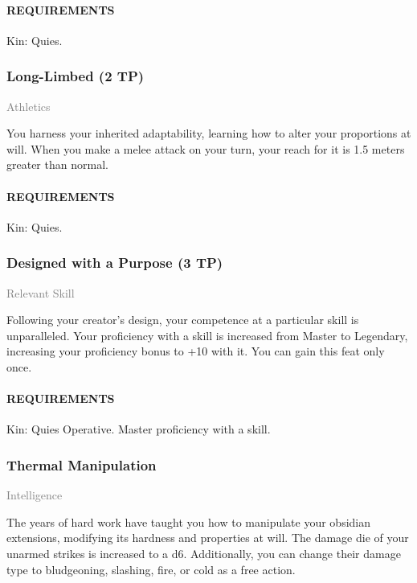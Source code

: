     \paragraph{REQUIREMENTS} Kin: Quies.

    \subsubsection{Long-Limbed (2 TP)} \label{feat::longlimbed}
    \small{\textcolor{gray}{Athletics}}

    \normalsize
    You harness your inherited adaptability, learning how to alter your proportions at will.
    When you make a melee attack on your turn, your reach for it is 1.5 meters greater than normal.
    \paragraph{REQUIREMENTS} Kin: Quies.

    \subsubsection{Designed with a Purpose (3 TP)} \label{feat::designedwithapurpose}
    \small{\textcolor{gray}{Relevant Skill}}

    \normalsize
    Following your creator's design, your competence at a particular skill is unparalleled.
    Your proficiency with a skill is increased from Master to Legendary, increasing your proficiency bonus to +10 with it.
    You can gain this feat only once.
    \paragraph{REQUIREMENTS} Kin: Quies Operative. Master proficiency with a skill.
    \subsubsection{Thermal Manipulation} \label{feat::thermalmanipulation}
    \small{\textcolor{gray}{Intelligence}}

    \normalsize
    The years of hard work have taught you how to manipulate your obsidian extensions, modifying its hardness and properties at will.
    The damage die of your unarmed strikes is increased to a d6.
    Additionally, you can change their damage type to bludgeoning, slashing, fire, or cold as a free action.
